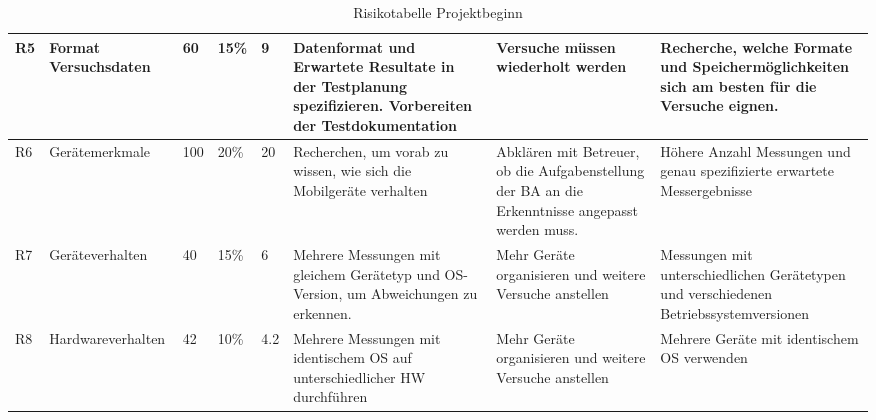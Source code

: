 \begin{landscape}
\begin{table}[h!]
\begin{tabularx}{\linewidth}{l l l l l X X X}
        \midrule 
        R5 & Format Versuchsdaten & 60 & 15\% & 9 & Datenformat und Erwartete Resultate in der Testplanung spezifizieren. Vorbereiten der Testdokumentation & Versuche müssen wiederholt werden & Recherche, welche Formate und Speichermöglichkeiten sich am besten für die Versuche eignen. \\ 
        \midrule 
        R6 & Gerätemerkmale & 100 & 20\% & 20 & Recherchen, um vorab zu wissen, wie sich die Mobilgeräte verhalten & Abklären mit Betreuer, ob die Aufgabenstellung der BA an die Erkenntnisse angepasst werden muss. & Höhere Anzahl Messungen und genau spezifizierte erwartete Messergebnisse \\ 
        \midrule 
        R7 & Geräteverhalten & 40 & 15\% & 6 & Mehrere Messungen mit gleichem Gerätetyp und OS-Version, um Abweichungen zu erkennen. & Mehr Geräte organisieren und weitere Versuche anstellen & Messungen mit unterschiedlichen Gerätetypen und verschiedenen Betriebssystemversionen \\ 
        \midrule 
        R8 & Hardwareverhalten & 42 & 10\% & 4.2 & Mehrere Messungen mit identischem OS auf unterschiedlicher HW durchführen & Mehr Geräte organisieren und weitere Versuche anstellen & Mehrere Geräte mit identischem OS verwenden \\
		\bottomrule 
	\end{tabularx} 
	\caption{Risikotabelle Projektbeginn
	\label{table:riskbeginn}} 
\end{table}

\clearpage 


\end{landscape}
